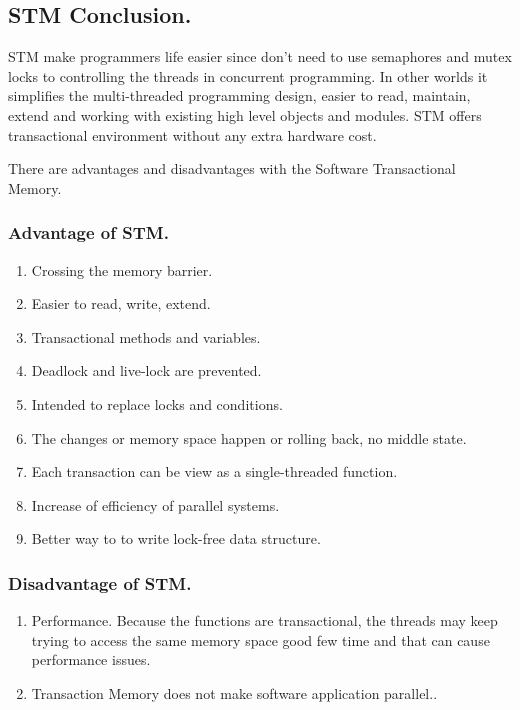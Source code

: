 \documentclass[12pt]{article}
\begin{document}
\subsection{STM Conclusion.}
STM make programmers life easier since don't need to use semaphores and mutex locks to controlling the threads in concurrent programming. In other worlds it simplifies the multi-threaded programming design, easier to read, maintain, extend and working with existing high level objects and modules. STM offers transactional environment without any extra hardware cost. \\

{\setlength{\parindent}{0cm}
There are advantages and disadvantages with the Software Transactional Memory.
\subsubsection{Advantage of STM.}
\begin{enumerate}
\item Crossing the memory barrier.
\item Easier to read, write, extend.
\item Transactional methods and variables.
\item Deadlock and live-lock are prevented.
\item Intended to replace locks and conditions.
\item The changes or memory space happen or rolling back, no middle state.
\item Each transaction can be view as a single-threaded function.
\item Increase of efficiency of parallel systems.
\item Better way to to write lock-free data structure.
\end{enumerate}
\subsubsection{Disadvantage of STM.}
\begin{enumerate}
\item Performance. Because the functions are transactional, the threads may keep trying to access the same memory space good few time and that can cause performance issues.
\item Transaction Memory does not make software application parallel..
\end{enumerate}

}

\clearpage
\end{document}

